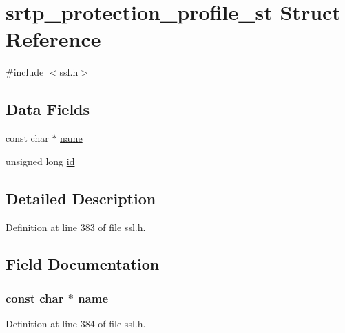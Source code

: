 \hypertarget{structsrtp__protection__profile__st}{}\section{srtp\+\_\+protection\+\_\+profile\+\_\+st Struct Reference}
\label{structsrtp__protection__profile__st}


{\ttfamily \#include $<$ssl.\+h$>$}

\subsection*{Data Fields}
\begin{DoxyCompactItemize}
\item 
const char $\ast$ \hyperlink{structsrtp__protection__profile__st_afcd1706c9144e6d6eee6127661ae3be2}{name}
\item 
unsigned long \hyperlink{structsrtp__protection__profile__st_af17b8bd946e0f93c6550050f9e8aa349}{id}
\end{DoxyCompactItemize}


\subsection{Detailed Description}


Definition at line 383 of file ssl.\+h.



\subsection{Field Documentation}
\subsubsection[{\texorpdfstring{name}{name}}]{\setlength{\rightskip}{0pt plus 5cm}const char $\ast$ name}\hypertarget{structsrtp__protection__profile__st_afcd1706c9144e6d6eee6127661ae3be2}{}\label{structsrtp__protection__profile__st_afcd1706c9144e6d6eee6127661ae3be2}


Definition at line 384 of file ssl.\+h.

